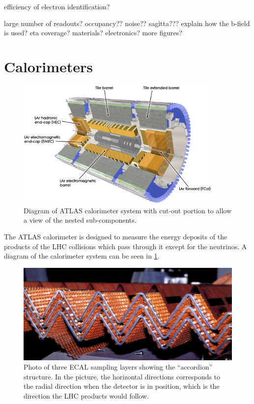 efficiency of electron identification?


large number of readouts?
occupancy??
noise??
sagitta???
explain how the b-field is used?
eta coverage?
materials?
electronics?
more figures?



\section{Calorimeters }
\begin{figure}[ht!]
\centering
\includegraphics[width=0.9\textwidth]{figures/atlas/calorimeter.eps}
\caption{Diagram of ATLAS calorimeter system with cut-out portion
to allow a view of the nested sub-components.}
\label{fig:atlas_calorimeter}
\end{figure}

The ATLAS calorimeter is designed to measure the energy
deposits of the products of the LHC collisions which pass through
it except for the neutrinos.  A diagram of the 
calorimeter system can be seen in \fig\ref{fig:atlas_calorimeter}.

\begin{figure}[ht]
\centering
\includegraphics[width=.5\textwidth]{figures/atlas/emcal_accordion.png}
\caption{Photo of three ECAL sampling layers
showing the ``accordion'' structure. In the picture, 
the horizontal directions corresponds to 
the radial direction when the detector is in position, which is
the direction the LHC products would follow.}
\label{fig:atlas_emcal_accordion}
\end{figure}

